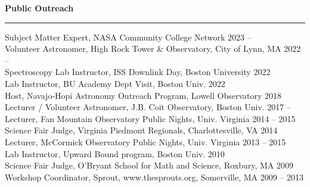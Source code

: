 \documentclass[12pt]{report}
\begin{document}
\noindent\bf{Public Outreach}\rm \hspace*{\fill} \\
\rule{\textwidth}{1pt}
\noindent Subject Matter Expert, NASA Community College Network \hfill 2023 –     \\
\noindent Volunteer Astronomer, High Rock Tower \& Observatory, City of Lynn, MA \hfill 2022 –     \\
\noindent Spectroscopy Lab Instructor, ISS Downlink Day, Boston University \hfill 2022\\
\noindent Lab Instructor, BU Academy Dept Visit, Boston Univ. \hfill 2022\\
\noindent Host, Navajo-Hopi Astronomy Outreach Program, Lowell Observatory \hfill 2018\\
\noindent Lecturer / Volunteer Astronomer, J.B. Coit Observatory, Boston Univ.	 \hfill 2017 –     \\
\noindent Lecturer, Fan Mountain Observatory Public Nights, Univ. Virginia \hfill 2014 – 2015\\
\noindent Science Fair Judge, Virginia Piedmont Regionals, Charlottesville, VA \hfill 2014\\
\noindent Lecturer, McCormick Observatory Public Nights, Univ. Virginia	 \hfill 2013 – 2015\\
\noindent Lab Instructor, Upward Bound program, Boston Univ. \hfill 2010\\
\noindent Science Fair Judge, O'Bryant School for Math and Science, Roxbury, MA \hfill 2009\\
\noindent Workshop Coordinator, Sprout, www.thesprouts.org, Somerville, MA \hfill 2009 – 2013\\
\end{document}
